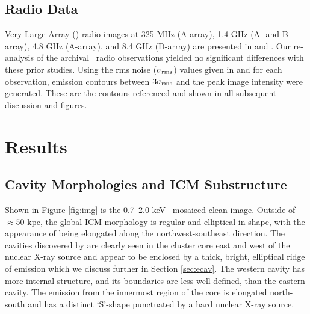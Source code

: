 \documentclass[apjpt4]{aastex}
\begin{document}
\subsection{Radio Data}
\label{sec:radio}

Very Large Array (\vla) radio images at 325 MHz (A-array), 1.4 GHz (A-
and B-array), 4.8 GHz (A-array), and 8.4 GHz (D-array) are presented
in \citet{gitti06} and \citet{birzan08}. Our re-analysis of the
archival \vla\ radio observations yielded no significant differences
with these prior studies. Using the rms noise ($\sigma_{\rm{rms}}$)
values given in \citet{gitti06} and \citet{birzan08} for each
observation, emission contours between $3\sigma_{\rm{rms}}$ and the
peak image intensity were generated. These are the contours referenced
and shown in all subsequent discussion and figures.

\section{Results}
\label{sec:results}

\subsection{Cavity Morphologies and ICM Substructure}
\label{sec:morph}

Shown in Figure \ref{fig:img} is the 0.7--2.0 keV \cxo\ mosaiced clean
image. Outside of $\approx 50$ kpc, the global ICM morphology is
regular and elliptical in shape, with the appearance of being
elongated along the northwest-southeast direction. The cavities
discovered by \citet{schindler01} are clearly seen in the cluster core
east and west of the nuclear X-ray source and appear to be enclosed by
a thick, bright, elliptical ridge of emission which we discuss further
in Section \ref{sec:ecav}. The western cavity has more internal
structure, and its boundaries are less well-defined, than the eastern
cavity. The emission from the innermost region of the core is
elongated north-south and has a distinct `S'-shape punctuated by a
hard nuclear X-ray source.
\end{document}
